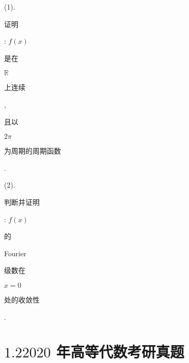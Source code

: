 \documentclass[10pt]{article}
\begin{document}
(1). \begin{CJK}{UTF8}{mj}证明\end{CJK}: $f(x)$ \begin{CJK}{UTF8}{mj}是在\end{CJK} $\mathbb{R}$ \begin{CJK}{UTF8}{mj}上连续\end{CJK}, \begin{CJK}{UTF8}{mj}且以\end{CJK} $2 \pi$ \begin{CJK}{UTF8}{mj}为周期的周期函数\end{CJK}.

(2). \begin{CJK}{UTF8}{mj}判断并证明\end{CJK}: $f(x)$ \begin{CJK}{UTF8}{mj}的\end{CJK} Fourier \begin{CJK}{UTF8}{mj}级数在\end{CJK} $x=0$ \begin{CJK}{UTF8}{mj}处的收敛性\end{CJK}.

\section{$1.22020$ 年高等代数考研真题}
\end{document}
